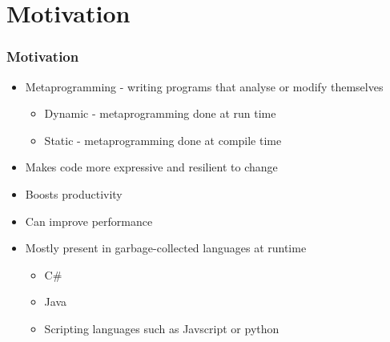 \section{Motivation}


\begin{frame}
	\frametitle{Motivation}

	\begin{itemize}
		\item Metaprogramming - writing programs that analyse or modify themselves\begin{itemize}
			      \item Dynamic - metaprogramming done at run time
			      \item Static - metaprogramming done at compile time
		      \end{itemize}
		\item Makes code more expressive and resilient to change
		\item Boosts productivity
		\item Can improve performance
		\item Mostly present in garbage-collected languages at runtime\begin{itemize}
			      \item C\#
			      \item Java
			      \item Scripting languages such as Javscript or python
		      \end{itemize}
	\end{itemize}

\end{frame}


